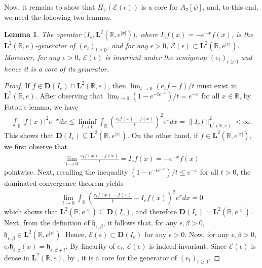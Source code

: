 \documentclass[12pt]{amsart}
\newcommand{\hlabel}{\phantomsection\label}
\numberwithin{equation}{section}
\newcommand{\bb}{\mathbb}
\newcommand{\cc}{\mathcal}
\renewcommand{\ge}{\geqslant}
\renewcommand{\le}{\leqslant}
\newcommand{\tred}{}
\newcommand{\mf}{\mathfrak}
\newcommand{\ttt}{\mathtt}
\newcommand{\bmrm}[2][2]{\mathbf{#2}^{#1}}
\newcommand{\Hpsi}{H_\psi}
\newcommand{\C}{\mathbf{C}}
\newcommand{\D}{\mathbf{D}}
\newcommand{\eps}{\epsilon}
\newcommand{\heb}{\mf{h}_{\eps,\beta}}
\renewcommand{\i}{\mathrm{i}}
\newcommand{\LRe}{\bmrm{L}(\bb{R},e)}
\newtheorem{lem}[thm]{Lemma}
\theoremstyle{definition}
\theoremstyle{assump}
\theoremstyle{remark}
\begin{document}
{Now, it remains to show that $\Hpsi(\cc{E}(\eps))$ is a core for $A_\ttt{2}[\psi]$, and, to this end, we need the following two lemmas.
\begin{lem}\hlabel{lem:core_invariant}
The operator $(I_{e},\bmrm{L}(\bb{R}, e^{|x|})\tred{)}$, where $I_{e}f(x)=-e^{-x}f(x)$, is the $\bmrm{L}(\bb{R},e)$-generator of $(e_t)_{t\ge 0}$, and for any $\eps>0$, $\cc{E}(\eps)\subset\bmrm{L}(\bb{R}, e^{|x|})$. Moreover, for any $\eps>0$, $\cc{E}(\eps)$ is invariant under the semigroup $(e_t)_{t\ge 0}$ and hence
it is a core of its  generator.
\end{lem}
\begin{proof} If $f\in\D(I_e)\cap\LRe$, then $\lim_{t\to 0}(e_t f-f)/t$ must exist in $\LRe$. After observing that $\lim_{t\to 0}(1-e^{-te^{-x}})/t=e^{-x}$ for all $x\in\bb{R}$, by Fatou's lemma, we have
	\begin{align*}
		\int_{\bb{R}} |f(x)|^2 e^{-x} dx\le\liminf_{t\to 0}\int_{\bb R}\left(\frac{e_t f(x)-f(x)}{t}\right)^2 e^x dx=\|I_e f\|^2_{\LRe}<\infty.
	\end{align*}
This shows that $\D(I_e)\subseteq\bmrm{L}(\bb{R}, e^{|x|})$. On the other hand, if $f\in\bmrm{L}(\bb{R},e^{|x|})$, we first observe that
\begin{align*}
\lim_{t\to 0}\frac{e_t f(x)-f(x)}{t}=I_{e} f(x)=-e^{-x} f(x)
\end{align*}
pointwise. Next, recalling the inequality $(1-e^{-te^{-x}})/t\le e^{-x}$ for all $t>0$, the dominated convergence theorem yields
\begin{align*}
	\lim_{t\to 0}\int_{\bb R}\left(\frac{e_t f(x)-f(x)}{t}-I_e f(x)\right)^2 e^x dx=0
\end{align*}
which shows that $\bmrm{L}(\bb{R}, e^{|x|})\subseteq\D(I_e)$, and therefore $\D(I_e)=\bmrm{L}(\bb{R}, e^{|x|})$. Next, from the definition of $\heb$, it follows that, for any $\eps,\beta>0$, $\heb\in\bmrm{L}(\bb{R}, e^{|x|})$. Hence, $\cc{E}(\eps)\subset\D(I_{e})$ for any $\eps>0$.  Now, for any $\eps,\beta>0$, $e_t\heb(x)=\mf{h}_{\eps,\beta+t}$. By linearity of $e_t$, $\cc{E}(\eps)$ is indeed invariant. Since $\cc{E}(\eps)$ is dense in $\bmrm{L}(\bb{R},e)$, by \cite[Proposition~1.7]{engel-nagel}, it is a core for the generator of $(e_t)_{t\ge 0}$.
\end{proof}


}
\end{document}
